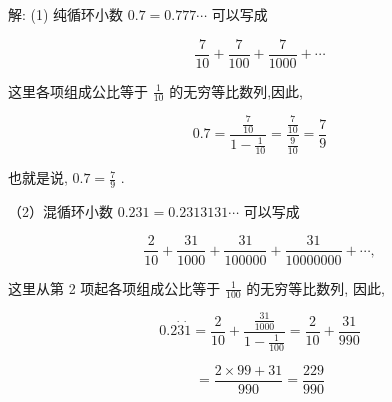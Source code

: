 \documentclass[lang=cn,newtx,10pt,scheme=chinese]{elegantbook}
\begin{document}
解: (1) 纯循环小数 \({0.7} = {0.777}\cdots\) 可以写成

\[
\frac{7}{10} + \frac{7}{100} + \frac{7}{1000} + \cdots
\]

这里各项组成公比等于 \(\frac{1}{10}\) 的无穷等比数列,因此,

\[
{0.7} = \frac{\frac{7}{10}}{1 - \frac{1}{10}} = \frac{\frac{7}{10}}{\frac{9}{10}} = \frac{7}{9}
\]

也就是说, \({0.7} = \frac{7}{9}\) .

（2）混循环小数 \({0.231} = {0.2313131}\cdots\) 可以写成

\[
\frac{2}{10} + \frac{31}{1000} + \frac{31}{100000} + \frac{31}{10000000} + \cdots ,
\]

这里从第 2 项起各项组成公比等于 \(\frac{1}{100}\) 的无穷等比数列, 因此,

\[
{0.2}\dot{3}\dot{1} = \frac{2}{10} + \frac{\frac{31}{1000}}{1 - \frac{1}{100}} = \frac{2}{10} + \frac{31}{990}
\]

\[
= \frac{2 \times {99} + {31}}{990} = \frac{229}{990}
\]
\end{document}
